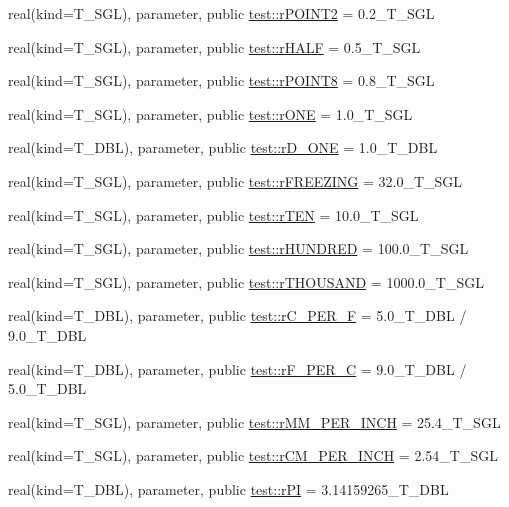 \begin{DoxyCompactItemize}
\item 
real(kind=T\_\-SGL), parameter, public \hyperlink{namespacetest_af379bbc7038181ce0aee8712e76e9867}{test::rPOINT2} = 0.2\_\-T\_\-SGL
\item 
real(kind=T\_\-SGL), parameter, public \hyperlink{namespacetest_a25c0227adf96fbd382b9cbac9600ba44}{test::rHALF} = 0.5\_\-T\_\-SGL
\item 
real(kind=T\_\-SGL), parameter, public \hyperlink{namespacetest_a52a9cf25cf2fc8828b5313923217c3d8}{test::rPOINT8} = 0.8\_\-T\_\-SGL
\item 
real(kind=T\_\-SGL), parameter, public \hyperlink{namespacetest_a884b235687921d6a1682ba733422bc2a}{test::rONE} = 1.0\_\-T\_\-SGL
\item 
real(kind=T\_\-DBL), parameter, public \hyperlink{namespacetest_a0677b58c46e425be305a3733296635ad}{test::rD\_\-ONE} = 1.0\_\-T\_\-DBL
\item 
real(kind=T\_\-SGL), parameter, public \hyperlink{namespacetest_a31db6c3796f52bf10cc407ec22ba3e80}{test::rFREEZING} = 32.0\_\-T\_\-SGL
\item 
real(kind=T\_\-SGL), parameter, public \hyperlink{namespacetest_a797e128f57e419a939928fd813fa5ef6}{test::rTEN} = 10.0\_\-T\_\-SGL
\item 
real(kind=T\_\-SGL), parameter, public \hyperlink{namespacetest_ae0e7b5cd24e302e72154de8cd84b911e}{test::rHUNDRED} = 100.0\_\-T\_\-SGL
\item 
real(kind=T\_\-SGL), parameter, public \hyperlink{namespacetest_a09ee29fcb038648024d5f3021e2f8e05}{test::rTHOUSAND} = 1000.0\_\-T\_\-SGL
\item 
real(kind=T\_\-DBL), parameter, public \hyperlink{namespacetest_a95fd1d84e61f442438a5e81b15c00185}{test::rC\_\-PER\_\-F} = 5.0\_\-T\_\-DBL / 9.0\_\-T\_\-DBL
\item 
real(kind=T\_\-DBL), parameter, public \hyperlink{namespacetest_ac2670ae461db7392fc780c5fc733d06f}{test::rF\_\-PER\_\-C} = 9.0\_\-T\_\-DBL / 5.0\_\-T\_\-DBL
\item 
real(kind=T\_\-SGL), parameter, public \hyperlink{namespacetest_a63234032fe45a56340c75291af043fd0}{test::rMM\_\-PER\_\-INCH} = 25.4\_\-T\_\-SGL
\item 
real(kind=T\_\-SGL), parameter, public \hyperlink{namespacetest_a99c086ce41f7f593657b86272536caa1}{test::rCM\_\-PER\_\-INCH} = 2.54\_\-T\_\-SGL
\item 
real(kind=T\_\-DBL), parameter, public \hyperlink{namespacetest_a374cf972567d5d75483cb459084f3d4e}{test::rPI} = 3.14159265\_\-T\_\-DBL
\item 

\end{DoxyCompactItemize}
